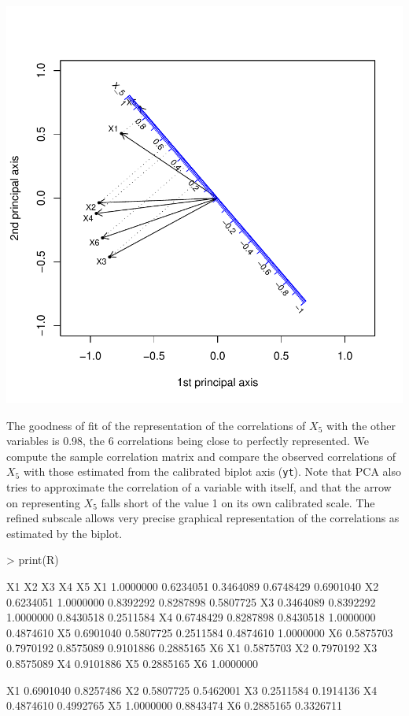 \documentclass[a4paper]{article}
\begin{document}
\includegraphics{CalibrationGuide-011}

The goodness of fit of the representation of the correlations of $X_5$ with the
other variables is 0.98, the 6 correlations being close to perfectly represented.
We compute the sample correlation matrix and compare the observed correlations of 
$X_5$ with those estimated from the calibrated biplot axis ({\tt yt}). Note that
PCA also tries to approximate the correlation of a variable with itself, and that
the arrow on representing $X_5$ falls short of the value 1 on its own calibrated scale.
The refined subscale allows very precise graphical representation of the correlations
as estimated by the biplot.

\begin{center}
\begin{Schunk}
\begin{Sinput}
> print(R)
\end{Sinput}
\begin{Soutput}
          X1        X2        X3        X4        X5
X1 1.0000000 0.6234051 0.3464089 0.6748429 0.6901040
X2 0.6234051 1.0000000 0.8392292 0.8287898 0.5807725
X3 0.3464089 0.8392292 1.0000000 0.8430518 0.2511584
X4 0.6748429 0.8287898 0.8430518 1.0000000 0.4874610
X5 0.6901040 0.5807725 0.2511584 0.4874610 1.0000000
X6 0.5875703 0.7970192 0.8575089 0.9101886 0.2885165
          X6
X1 0.5875703
X2 0.7970192
X3 0.8575089
X4 0.9101886
X5 0.2885165
X6 1.0000000
\end{Soutput}
\begin{Soutput}
        [,1]      [,2]
X1 0.6901040 0.8257486
X2 0.5807725 0.5462001
X3 0.2511584 0.1914136
X4 0.4874610 0.4992765
X5 1.0000000 0.8843474
X6 0.2885165 0.3326711
\end{Soutput}
\end{Schunk}
\end{center}
\end{document}
